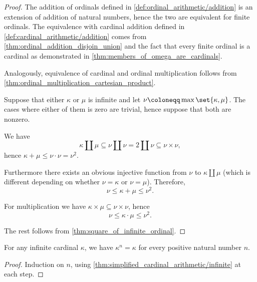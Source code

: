 \begin{proof}
   The addition of ordinals defined in \cref{def:ordinal_arithmetic/addition} is an extension of addition of natural numbers, hence the two are equivalent for finite ordinals. The equivalence with cardinal addition defined in \cref{def:cardinal_arithmetic/addition} comes from \cref{thm:ordinal_addition_disjoin_union} and the fact that every finite ordinal is a cardinal as demonstrated in \cref{thm:members_of_omega_are_cardinals}.

  Analogously, equivalence of cardinal and ordinal multiplication follows from \cref{thm:ordinal_multiplication_cartesian_product}.

   Suppose that either \( \kappa \) or \( \mu \) is infinite and let \( \nu \coloneqq \max\set{ \kappa, \mu } \). The cases where either of them is zero are trivial, hence suppose that both are nonzero.

  We have
  \begin{equation*}
    \kappa \amalg \mu \subseteq \nu \amalg \nu = 2 \amalg \nu \subseteq \nu \times \nu,
  \end{equation*}
  hence \( \kappa + \mu \leq \nu \cdot \nu = \nu^2 \).

  Furthermore there exists an obvious injective function from \( \nu \) to \( \kappa \amalg \mu \) (which is different depending on whether \( \nu = \kappa \) or \( \nu = \mu \)). Therefore,
  \begin{equation*}
    \nu \leq \kappa + \mu \leq \nu^2.
  \end{equation*}

  For multiplication we have \( \kappa \times \mu \subseteq \nu \times \nu \), hence
  \begin{equation*}
    \nu \leq \kappa \cdot \mu \leq \nu^2.
  \end{equation*}

  The rest follows from \cref{thm:square_of_infinite_ordinal}.
\end{proof}

\begin{corollary}\label{thm:finite_cardinal_exponent}
  For any infinite cardinal \( \kappa \), we have \( \kappa^n = \kappa \) for every positive natural number \( n \).
\end{corollary}
\begin{proof}
  Induction on \( n \), using \cref{thm:simplified_cardinal_arithmetic/infinite} at each step.
\end{proof}

